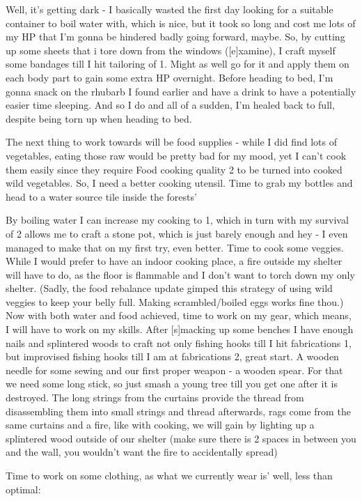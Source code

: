 \documentclass[11pt]{report}
\begin{document}
Well, it's getting dark - I basically wasted the first day looking for a suitable container to boil water with, which is nice, but it took so long and cost me lots of my HP that I'm gonna be hindered badly going forward, maybe. So, by cutting up some sheets that i tore down from the windows ([e]xamine), I craft myself some bandages till I hit tailoring of 1. Might as well go for it and apply them on each body part to gain some extra HP overnight. Before heading to bed, I'm gonna snack on the rhubarb I found earlier and have a drink to have a potentially easier time sleeping. And so I do and all of a sudden, I'm healed back to full, despite being torn up when heading to bed.

The next thing to work towards will be food supplies - while I did find lots of vegetables, eating those raw would be pretty bad for my mood, yet I can't cook them easily since they require Food cooking quality 2 to be turned into cooked wild vegetables. So, I need a better cooking utensil. Time to grab my bottles and head to a water source tile inside the forests'

By boiling water I can increase my cooking to 1, which in turn with my survival of 2 allows me to craft a stone pot, which is just barely enough and hey - I even managed to make that on my first try, even better. Time to cook some veggies. While I would prefer to have an indoor cooking place, a fire outside my shelter will have to do, as the floor is flammable and I don't want to torch down my only shelter.
(Sadly, the food rebalance update gimped this strategy of using wild veggies to keep your belly full. Making scrambled/boiled eggs works fine thou.)
Now with both water and food achieved, time to work on my gear, which means, I will have to work on my skills. After [s]macking up some benches I have enough nails and splintered woods to craft not only fishing hooks till I hit fabrications 1, but improvised fishing hooks till I am at fabrications 2, great start. A wooden needle for some sewing and our first proper weapon - a wooden spear. For that we need some long stick, so just smash a young tree till you get one after it is destroyed. The long strings from the curtains provide the thread from disassembling them into small strings and thread afterwards, rags come from the same curtains and a fire, like with cooking, we will gain by lighting up a splintered wood outside of our shelter (make sure there is 2 spaces in between you and the wall, you wouldn't want the fire to accidentally spread)

Time to work on some clothing, as what we currently wear is' well, less than optimal:
\end{document}
